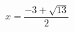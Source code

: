 \documentclass[preview]{standalone}
\begin{document}
\begin{align*}
x = \dfrac{-3 + \sqrt{13} }{2}
\end{align*}
\end{document}
